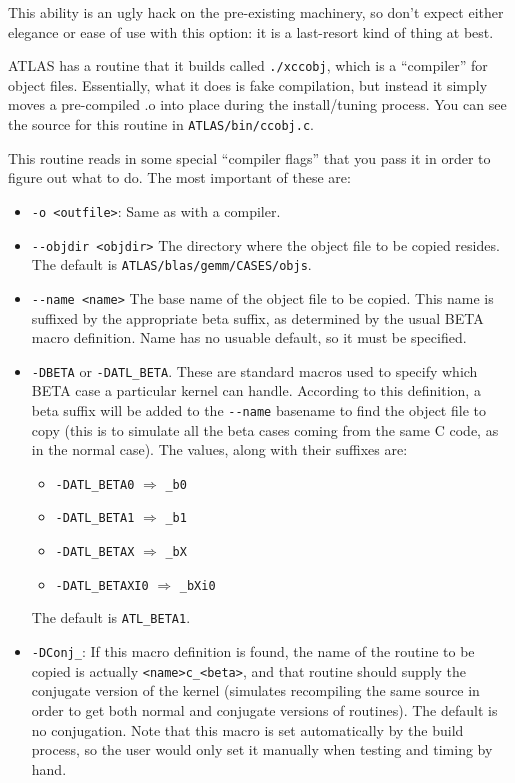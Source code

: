 \documentclass[11pt]{article}
\begin{document}
This ability is an ugly hack on the pre-existing machinery, so don't expect
either elegance or ease of use with this option: it is a last-resort kind
of thing at best.

ATLAS has a routine that it builds called {\tt ./xccobj}, which is a 
``compiler'' for object files.  Essentially, what it does is fake compilation,
but instead it simply moves a pre-compiled .o into place during the 
install/tuning process.  You can see the source for this routine in
{\tt ATLAS/bin/ccobj.c}.

This routine reads in some special ``compiler flags'' that you pass it in
order to figure out what to do.  The most important of these are:
\begin{itemize}
\item \verb+-o <outfile>+: Same as with a compiler.
\item \verb+--objdir <objdir>+ The directory where the object file to be
      copied resides.  The default is {\tt ATLAS/blas/gemm/CASES/objs}.
\item \verb+--name <name>+ The base name of the object file to be copied.
This name is suffixed by the appropriate beta suffix, as determined by the
usual BETA macro definition.  Name has no usuable default, so it must be
specified. 
\item \verb+-DBETA+ or \verb+-DATL_BETA+.  These are standard macros used
to specify which BETA case a particular kernel can handle.  According to
this definition, a beta suffix will be added to the \verb+--name+ basename
to find the object file to copy (this is to simulate all the beta cases
coming from the same C code, as in the normal case).  The values, along with
their suffixes are:
   \begin{itemize}
      \item \verb+-DATL_BETA0+ $\Rightarrow$ \verb+_b0+
      \item \verb+-DATL_BETA1+ $\Rightarrow$ \verb+_b1+
      \item \verb+-DATL_BETAX+ $\Rightarrow$ \verb+_bX+
      \item \verb+-DATL_BETAXI0+ $\Rightarrow$ \verb+_bXi0+
   \end{itemize}
The default is \verb+ATL_BETA1+.
\item \verb+-DConj_+:  If this macro definition is found, the name of the
routine to be copied is actually \verb+<name>c_<beta>+, and that routine
should supply the conjugate version of the kernel (simulates recompiling the
same source in order to get both normal and conjugate versions of routines).
The default is no conjugation.  
Note that this macro is set automatically by the build process,
so the user would only set it manually when testing and timing by hand.
\end{itemize}
\end{document}
